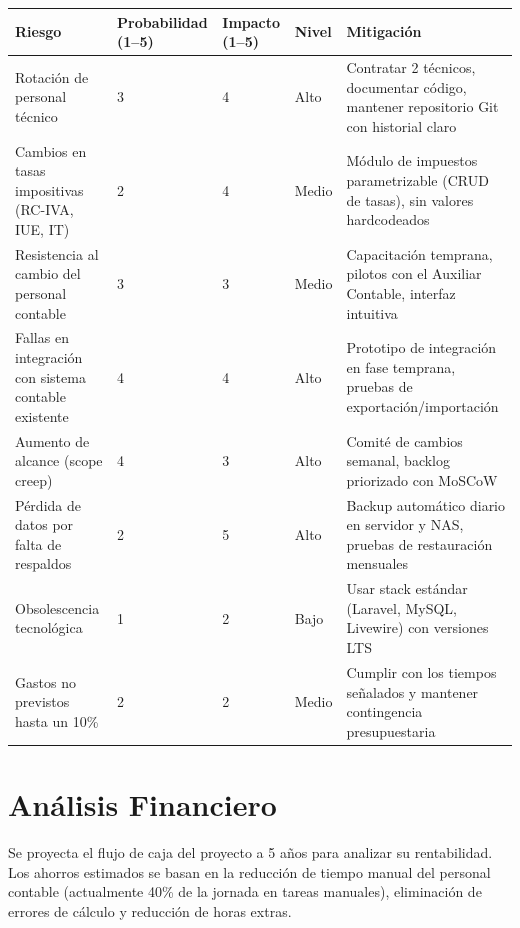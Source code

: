 \documentclass[stu]{apa7}
\begin{document}
\begin{longtable}{|L{3.5cm}|C{1.5cm}|C{1.5cm}|C{1.5cm}|L{4.5cm}|}
\hline
{}
\textbf{Riesgo} & \textbf{Probabilidad (1--5)} & \textbf{Impacto (1--5)} & \textbf{Nivel} & \textbf{Mitigación} \\
\hline
Rotación de personal técnico & 3 & 4 & Alto & Contratar 2 técnicos, documentar código, mantener repositorio Git con historial claro \\
\hline
Cambios en tasas impositivas (RC-IVA, IUE, IT) & 2 & 4 & Medio & Módulo de impuestos parametrizable (CRUD de tasas), sin valores hardcodeados \\
\hline
Resistencia al cambio del personal contable & 3 & 3 & Medio & Capacitación temprana, pilotos con el Auxiliar Contable, interfaz intuitiva \\
\hline
Fallas en integración con sistema contable existente & 4 & 4 & Alto & Prototipo de integración en fase temprana, pruebas de exportación/importación \\
\hline
Aumento de alcance (scope creep) & 4 & 3 & Alto & Comité de cambios semanal, backlog priorizado con MoSCoW \\
\hline
Pérdida de datos por falta de respaldos & 2 & 5 & Alto & Backup automático diario en servidor y NAS, pruebas de restauración mensuales \\
\hline
Obsolescencia tecnológica & 1 & 2 & Bajo & Usar stack estándar (Laravel, MySQL, Livewire) con versiones LTS \\
\hline
Gastos no previstos hasta un 10\% & 2 & 2 & Medio & Cumplir con los tiempos señalados y mantener contingencia presupuestaria \\
\hline
\end{longtable}

\section{Análisis Financiero}

Se proyecta el flujo de caja del proyecto a 5 años para analizar su rentabilidad. Los ahorros estimados se basan en la reducción de tiempo manual del personal contable (actualmente 40\% de la jornada en tareas manuales), eliminación de errores de cálculo y reducción de horas extras.
\end{document}
